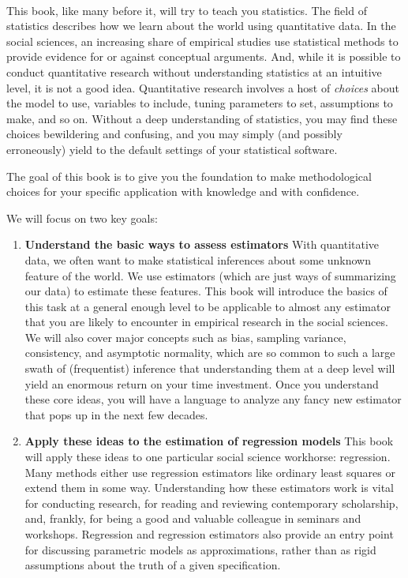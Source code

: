 \documentclass[
  letterpaper,
  DIV=11,
  numbers=noendperiod]{scrreprt}
\theoremstyle{plain}
\theoremstyle{definition}
\theoremstyle{definition}
\theoremstyle{remark}
\begin{document}
\(\,\)

This book, like many before it, will try to teach you statistics. The
field of statistics describes how we learn about the world using
quantitative data. In the social sciences, an increasing share of
empirical studies use statistical methods to provide evidence for or
against conceptual arguments. And, while it is possible to conduct
quantitative research without understanding statistics at an intuitive
level, it is not a good idea. Quantitative research involves a host of
\emph{choices} about the model to use, variables to include, tuning
parameters to set, assumptions to make, and so on. Without a deep
understanding of statistics, you may find these choices bewildering and
confusing, and you may simply (and possibly erroneously) yield to the
default settings of your statistical software.

The goal of this book is to give you the foundation to make
methodological choices for your specific application with knowledge and
with confidence.

We will focus on two key goals:

\begin{enumerate}
\def\labelenumi{\arabic{enumi}.}
\item
  \textbf{Understand the basic ways to assess estimators} With
  quantitative data, we often want to make statistical inferences about
  some unknown feature of the world. We use estimators (which are just
  ways of summarizing our data) to estimate these features. This book
  will introduce the basics of this task at a general enough level to be
  applicable to almost any estimator that you are likely to encounter in
  empirical research in the social sciences. We will also cover major
  concepts such as bias, sampling variance, consistency, and asymptotic
  normality, which are so common to such a large swath of (frequentist)
  inference that understanding them at a deep level will yield an
  enormous return on your time investment. Once you understand these
  core ideas, you will have a language to analyze any fancy new
  estimator that pops up in the next few decades.
\item
  \textbf{Apply these ideas to the estimation of regression models} This
  book will apply these ideas to one particular social science
  workhorse: regression. Many methods either use regression estimators
  like ordinary least squares or extend them in some way. Understanding
  how these estimators work is vital for conducting research, for
  reading and reviewing contemporary scholarship, and, frankly, for
  being a good and valuable colleague in seminars and workshops.
  Regression and regression estimators also provide an entry point for
  discussing parametric models as approximations, rather than as rigid
  assumptions about the truth of a given specification.
\end{enumerate}
\end{document}
